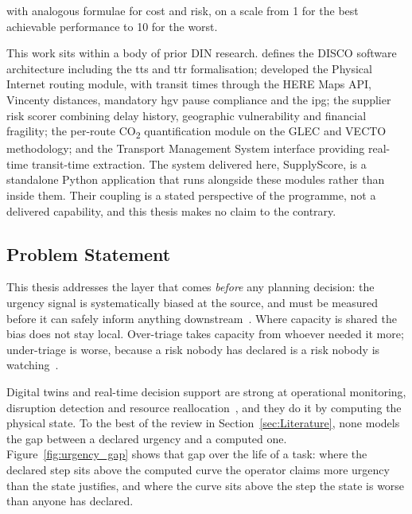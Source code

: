 with analogous formulae for cost and risk, on a scale from 1 for the best achievable
performance to 10 for the worst.

This work sits within a body of prior DIN research. \textcite{baxas2025architecture} defines
the DISCO software architecture including the \gls{tts} and \gls{ttr} formalisation;
\textcite{baulain2024internet} developed the Physical Internet routing module, with transit
times through the HERE Maps API, Vincenty distances, mandatory \gls{hgv} pause compliance and
the \gls{ipg}; \textcite{kabouche2025scoring} the supplier risk
scorer combining delay history, geographic vulnerability and financial fragility;
\textcite{cordova2024green} the per-route CO\textsubscript{2} quantification module on the GLEC
and VECTO methodology; and \textcite{mondelice2025tms} the Transport Management System
interface providing real-time transit-time extraction. The system delivered here, SupplyScore,
is a standalone Python application that runs alongside these modules rather than inside them.
Their coupling is a stated perspective of the programme, not a delivered capability, and this
thesis makes no claim to the contrary.

\subsection{Problem Statement}
\label{sec:intro_problem}

This thesis addresses the layer that comes \emph{before} any planning decision: the urgency
signal is systematically biased at the source, and must be measured before it can safely
inform anything downstream~\autocite{zhu2018mere,rusou2020psychology}. Where capacity is
shared the bias does not stay local. Over-triage takes capacity from whoever needed it more;
under-triage is worse, because a risk nobody has declared is a risk nobody is
watching~\autocite{li2020exploring,ivanov2020digital}.

Digital twins and real-time decision support are strong at operational monitoring, disruption
detection and resource
reallocation~\autocite{ding2023realtime,leung2022digital,hrusovsky2021realtime,karam2022realtime,zhu2025industry5},
and they do it by computing the physical state. To the best of the review in
Section~\ref{sec:Literature}, none models the gap between a declared urgency and a computed
one. Figure~\ref{fig:urgency_gap} shows that gap over the life of a task: where the declared
step sits above the computed curve the operator claims more urgency than the state justifies,
and where the curve sits above the step the state is worse than anyone has declared.

